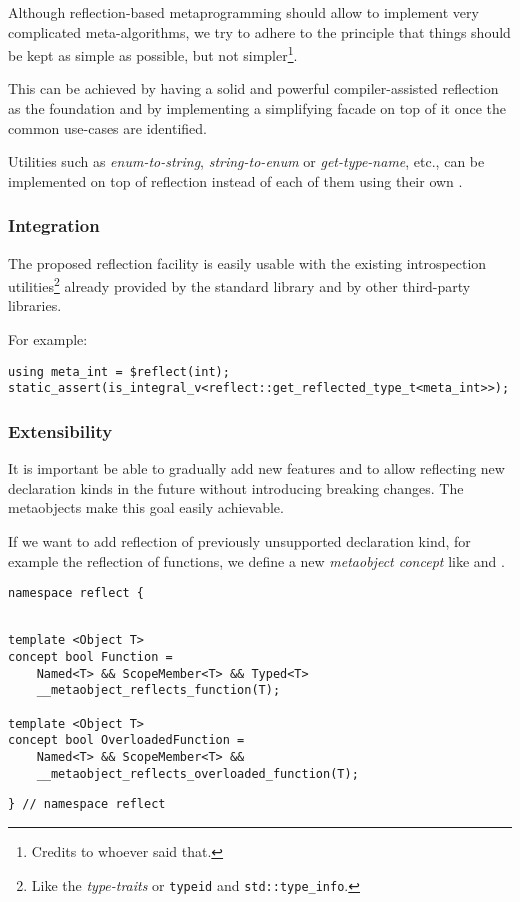 Although reflection-based metaprogramming should allow to implement very
complicated meta-algorithms, we try to adhere to the principle that things
should be kept as simple as possible, but not simpler\footnote{Credits to
whoever said that.}.

This can be achieved by having a solid and powerful compiler-assisted reflection
as the foundation and by implementing a simplifying facade on top of it once
the common use-cases are identified.

Utilities such as {\em enum-to-string}, {\em string-to-enum} or {\em get-type-name},
etc., can be implemented on top of reflection instead of each of them using their own
.

\subsubsection{Integration}
\label{design-integration}

The proposed reflection facility is easily
usable with the existing introspection utilities\footnote{Like the
{\em type-traits} or \texttt{typeid} and \texttt{std::type\_info}.}
already provided by the standard library and by other third-party libraries.

For example:

\begin{verbatim}
using meta_int = $reflect(int);
static_assert(is_integral_v<reflect::get_reflected_type_t<meta_int>>);
\end{verbatim}

\subsubsection{Extensibility}
\label{design-extensibility}

It is important be able to gradually add new features and to allow
reflecting new declaration kinds in the future without introducing breaking changes.
The metaobjects make this goal easily achievable.

If we want to add reflection of previously unsupported declaration kind, for example
the reflection of functions, we define a new {\em metaobject concept} like
 and .

\begin{verbatim}
namespace reflect {
\end{verbatim}
\begin{verbatim}

template <Object T>
concept bool Function = 
	Named<T> && ScopeMember<T> && Typed<T>
	__metaobject_reflects_function(T);

template <Object T>
concept bool OverloadedFunction =
	Named<T> && ScopeMember<T> &&
	__metaobject_reflects_overloaded_function(T);

\end{verbatim}
\begin{verbatim}
} // namespace reflect
\end{verbatim}

